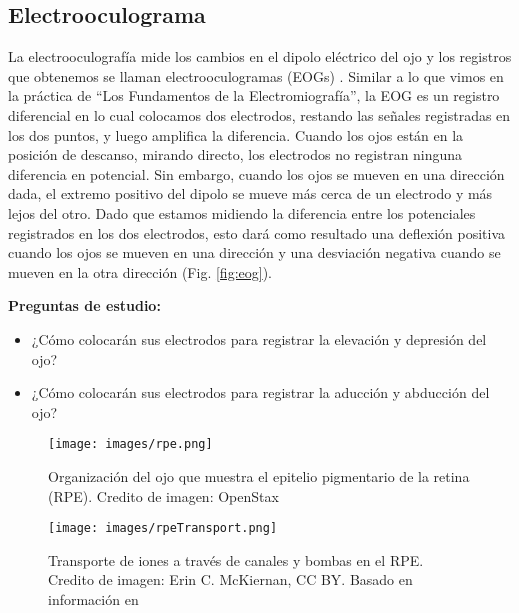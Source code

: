 \documentclass[12pt]{article}
\begin{document}
\subsection*{Electrooculograma}
La electrooculografía mide los cambios en el dipolo eléctrico del ojo
y los registros que obtenemos se llaman electrooculogramas (EOGs)
\cite{heide1999electrooculography,marg1951development,malmivuo1995bioelectromagnetism}. Similar
a lo que vimos en la práctica de ``Los Fundamentos de la
Electromiografía'', la EOG es un registro diferencial en lo cual
colocamos dos electrodos, restando las señales registradas en los dos
puntos, y luego amplifica la diferencia. Cuando los ojos están en la
posición de descanso, mirando directo, los electrodos no registran
ninguna diferencia en potencial. Sin embargo, cuando los ojos se
mueven en una dirección dada, el extremo positivo del dipolo se mueve
más cerca de un electrodo y más lejos del otro. Dado que estamos
midiendo la diferencia entre los potenciales registrados en los dos
electrodos, esto dará como resultado una deflexión positiva cuando los
ojos se mueven en una dirección y una desviación negativa cuando se
mueven en la otra dirección \cite{malmivuo1995bioelectromagnetism}
(Fig. \ref{fig:eog}).

\vspace{0.5cm}

\textbf{Preguntas de estudio:}

\begin{itemize}
\item ¿Cómo colocarán sus electrodos para registrar la elevación y
  depresión del ojo?
\item ¿Cómo colocarán sus electrodos para registrar la aducción y
  abducción del ojo?
\end{itemize} 

\begin{figure}[t!]
\centering
\texttt{[image: images/rpe.png]}
\caption{Organización del ojo que muestra el epitelio pigmentario de
  la retina (RPE). Credito de imagen: OpenStax
  \cite{openStax2017sensory} }
\label{fig:rpe}
\end{figure}

\begin{figure}[b!]
\centering
\texttt{[image: images/rpeTransport.png]}
\caption{Transporte de iones a través de canales y bombas en el
  RPE. Credito de imagen: Erin C. McKiernan, CC BY. Basado en
  información en \cite{joseph1991apical,quinn1992ion}}
\label{fig:crp}
\end{figure}
\end{document}
